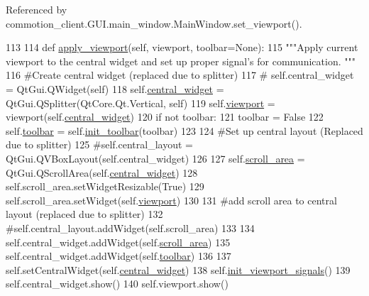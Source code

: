 Referenced by commotion\-\_\-client.\-G\-U\-I.\-main\-\_\-window.\-Main\-Window.\-set\-\_\-viewport().


\begin{DoxyCode}
113 
114     \textcolor{keyword}{def }\hyperlink{classcommotion__client_1_1GUI_1_1main__window_1_1MainWindow_a2972ac997218f50db2c18762ac48f23c}{apply\_viewport}(self, viewport, toolbar=None):
115         \textcolor{stringliteral}{"""Apply current viewport to the central widget and set up proper signal's for communication. """}
116         \textcolor{comment}{#Create central widget (replaced due to splitter)}
117         \textcolor{comment}{#        self.central\_widget = QtGui.QWidget(self)}
118         self.\hyperlink{classcommotion__client_1_1GUI_1_1main__window_1_1MainWindow_a6f0f7b66344ea647e8bdf9c73c94a3a4}{central\_widget} = QtGui.QSplitter(QtCore.Qt.Vertical, self)
119         self.\hyperlink{classcommotion__client_1_1GUI_1_1main__window_1_1MainWindow_a7399ad8133834fe65dca400825f008e7}{viewport} = viewport(self.\hyperlink{classcommotion__client_1_1GUI_1_1main__window_1_1MainWindow_a6f0f7b66344ea647e8bdf9c73c94a3a4}{central\_widget})
120         \textcolor{keywordflow}{if} \textcolor{keywordflow}{not} toolbar:
121             toolbar = \textcolor{keyword}{False}
122         self.\hyperlink{classcommotion__client_1_1GUI_1_1main__window_1_1MainWindow_a8ca81a512a5d12b59a8804d7fc0f3cc4}{toolbar} = self.\hyperlink{classcommotion__client_1_1GUI_1_1main__window_1_1MainWindow_a08bdbda447c256d0cf5355d928ebb3fe}{init\_toolbar}(toolbar)
123 
124         \textcolor{comment}{#Set up central layout (Replaced due to splitter)}
125         \textcolor{comment}{#self.central\_layout = QtGui.QVBoxLayout(self.central\_widget)}
126 
127         self.\hyperlink{classcommotion__client_1_1GUI_1_1main__window_1_1MainWindow_af8938670870bbbca1f3ddbd6c6f6dbc9}{scroll\_area} = QtGui.QScrollArea(self.\hyperlink{classcommotion__client_1_1GUI_1_1main__window_1_1MainWindow_a6f0f7b66344ea647e8bdf9c73c94a3a4}{central\_widget})
128         self.scroll\_area.setWidgetResizable(\textcolor{keyword}{True})
129         self.scroll\_area.setWidget(self.\hyperlink{classcommotion__client_1_1GUI_1_1main__window_1_1MainWindow_a7399ad8133834fe65dca400825f008e7}{viewport})
130 
131         \textcolor{comment}{#add scroll area to central layout (replaced due to splitter)}
132         \textcolor{comment}{#self.central\_layout.addWidget(self.scroll\_area)}
133 
134         self.central\_widget.addWidget(self.\hyperlink{classcommotion__client_1_1GUI_1_1main__window_1_1MainWindow_af8938670870bbbca1f3ddbd6c6f6dbc9}{scroll\_area})
135         self.central\_widget.addWidget(self.\hyperlink{classcommotion__client_1_1GUI_1_1main__window_1_1MainWindow_a8ca81a512a5d12b59a8804d7fc0f3cc4}{toolbar})
136         
137         self.setCentralWidget(self.\hyperlink{classcommotion__client_1_1GUI_1_1main__window_1_1MainWindow_a6f0f7b66344ea647e8bdf9c73c94a3a4}{central\_widget})
138         self.\hyperlink{classcommotion__client_1_1GUI_1_1main__window_1_1MainWindow_abf5e8a0add7f4fa1480c825a74e0e9b9}{init\_viewport\_signals}()
139         self.central\_widget.show()
140         self.viewport.show()

\end{DoxyCode}
